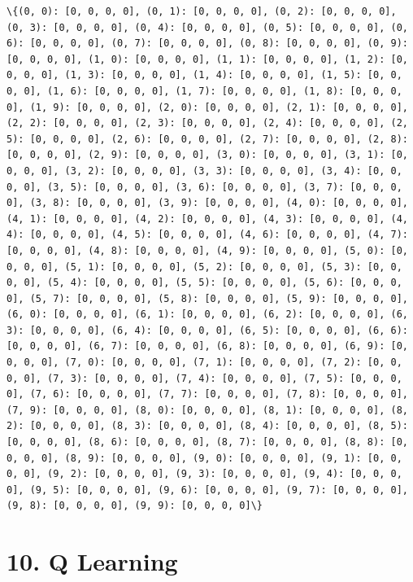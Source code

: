 \documentclass[11pt]{article}
\begin{document}
    \begin{Verbatim}[commandchars=\\\{\}]
\{(0, 0): [0, 0, 0, 0], (0, 1): [0, 0, 0, 0], (0, 2): [0, 0, 0, 0], (0, 3): [0, 0, 0, 0], (0, 4): [0, 0, 0, 0], (0, 5): [0, 0, 0, 0], (0, 6): [0, 0, 0, 0], (0, 7): [0, 0, 0, 0], (0, 8): [0, 0, 0, 0], (0, 9): [0, 0, 0, 0], (1, 0): [0, 0, 0, 0], (1, 1): [0, 0, 0, 0], (1, 2): [0, 0, 0, 0], (1, 3): [0, 0, 0, 0], (1, 4): [0, 0, 0, 0], (1, 5): [0, 0, 0, 0], (1, 6): [0, 0, 0, 0], (1, 7): [0, 0, 0, 0], (1, 8): [0, 0, 0, 0], (1, 9): [0, 0, 0, 0], (2, 0): [0, 0, 0, 0], (2, 1): [0, 0, 0, 0], (2, 2): [0, 0, 0, 0], (2, 3): [0, 0, 0, 0], (2, 4): [0, 0, 0, 0], (2, 5): [0, 0, 0, 0], (2, 6): [0, 0, 0, 0], (2, 7): [0, 0, 0, 0], (2, 8): [0, 0, 0, 0], (2, 9): [0, 0, 0, 0], (3, 0): [0, 0, 0, 0], (3, 1): [0, 0, 0, 0], (3, 2): [0, 0, 0, 0], (3, 3): [0, 0, 0, 0], (3, 4): [0, 0, 0, 0], (3, 5): [0, 0, 0, 0], (3, 6): [0, 0, 0, 0], (3, 7): [0, 0, 0, 0], (3, 8): [0, 0, 0, 0], (3, 9): [0, 0, 0, 0], (4, 0): [0, 0, 0, 0], (4, 1): [0, 0, 0, 0], (4, 2): [0, 0, 0, 0], (4, 3): [0, 0, 0, 0], (4, 4): [0, 0, 0, 0], (4, 5): [0, 0, 0, 0], (4, 6): [0, 0, 0, 0], (4, 7): [0, 0, 0, 0], (4, 8): [0, 0, 0, 0], (4, 9): [0, 0, 0, 0], (5, 0): [0, 0, 0, 0], (5, 1): [0, 0, 0, 0], (5, 2): [0, 0, 0, 0], (5, 3): [0, 0, 0, 0], (5, 4): [0, 0, 0, 0], (5, 5): [0, 0, 0, 0], (5, 6): [0, 0, 0, 0], (5, 7): [0, 0, 0, 0], (5, 8): [0, 0, 0, 0], (5, 9): [0, 0, 0, 0], (6, 0): [0, 0, 0, 0], (6, 1): [0, 0, 0, 0], (6, 2): [0, 0, 0, 0], (6, 3): [0, 0, 0, 0], (6, 4): [0, 0, 0, 0], (6, 5): [0, 0, 0, 0], (6, 6): [0, 0, 0, 0], (6, 7): [0, 0, 0, 0], (6, 8): [0, 0, 0, 0], (6, 9): [0, 0, 0, 0], (7, 0): [0, 0, 0, 0], (7, 1): [0, 0, 0, 0], (7, 2): [0, 0, 0, 0], (7, 3): [0, 0, 0, 0], (7, 4): [0, 0, 0, 0], (7, 5): [0, 0, 0, 0], (7, 6): [0, 0, 0, 0], (7, 7): [0, 0, 0, 0], (7, 8): [0, 0, 0, 0], (7, 9): [0, 0, 0, 0], (8, 0): [0, 0, 0, 0], (8, 1): [0, 0, 0, 0], (8, 2): [0, 0, 0, 0], (8, 3): [0, 0, 0, 0], (8, 4): [0, 0, 0, 0], (8, 5): [0, 0, 0, 0], (8, 6): [0, 0, 0, 0], (8, 7): [0, 0, 0, 0], (8, 8): [0, 0, 0, 0], (8, 9): [0, 0, 0, 0], (9, 0): [0, 0, 0, 0], (9, 1): [0, 0, 0, 0], (9, 2): [0, 0, 0, 0], (9, 3): [0, 0, 0, 0], (9, 4): [0, 0, 0, 0], (9, 5): [0, 0, 0, 0], (9, 6): [0, 0, 0, 0], (9, 7): [0, 0, 0, 0], (9, 8): [0, 0, 0, 0], (9, 9): [0, 0, 0, 0]\}

    \end{Verbatim}

    \section{10. Q Learning}\label{q-learning}
\end{document}
